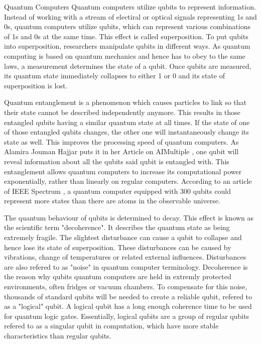\documentclass[aps,preprintnumbers,twocolumn]{revtex4}
\begin{document}
\begin{section}{Quantum Computers}
Quantum computers utilize qubits to represent information. 
Instead of working with a stream of electiral or optical signals representing 1s and 0s, 
quantum computers utilize qubits, which can represent various combinations of 1s and 0s at the same time. 
This effect is called superposition. To put qubits into superposition, 
researchers manipulate qubits in different ways. As quantum computing is based on quantum mechanics and hence has to obey to the same laws, 
a measurement determines the state of a qubit. Once qubits are measured, 
its quantum state immediately collapses to either 1 or 0 and its state of superposition is lost.

Quantum entanglement is a phenomenon which causes particles to link so that their state cannot be described independently anymore.
This results in those entangled qubits having a similar quantum state at all times.
If the state of one of those entangled qubits changes,
the other one will instantaneously change its state as well. This improves the processing speed of quantum computers. As Alamira Jouman Hajjar puts it in her Article on AIMultiple \cite{AIMultiple}, one qubit will reveal information about all the qubits said qubit is entangled with.
This entanglement allows quantum computers to increase its computational power exponentially,
rather than linearly on regular computers.
According to an article of IEEE Spectrum \cite{IEEE}, a quantum computer equipped with 300 qubits could represent more states than there are atoms in the observable universe.

The quantum behaviour of qubits is determined to decay.
This effect is known as the scientific term "decoherence".
It describes the quantum state as being extremely fragile.
The slightest disturbance can cause a qubit to collapse and hence lose its state of superposition.
These disturbances can be caused by vibrations, change of temperatures or related external influences.
Disturbances are also refered to as "noise" in quantum computer terminology.
Decoherence is the reason why qubits quantum computers are held in extremly protected environments, 
often fridges or vacuum chambers.
To compensate for this noise, 
thousands of standard qubits will be needed to create a reliable qubit, 
refered to as a "logical" qubit. 
A logical qubit has a long enough coherence time to be used for quantum logic gates. 
Essentially, logical qubits are a group of regular qubits refered to as a singular qubit in computation, 
which have more stable characteristics than regular qubits.


\end{section}
\end{document}
